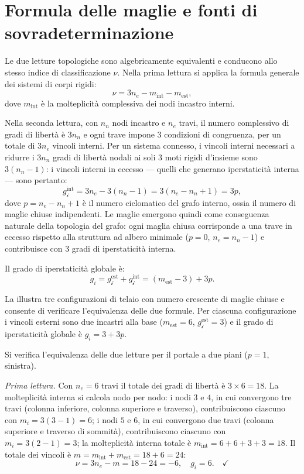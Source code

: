 \section{Formula delle maglie e fonti di sovradeterminazione}
\label{sec:telai_formula_maglie}


Le due letture topologiche sono algebricamente
equivalenti e conducono allo stesso indice di
classificazione $\nu$. Nella prima lettura si
applica la formula generale dei sistemi di corpi
rigidi:
\[
\nu = 3n_e - m_{\text{int}} - m_{\text{est}},
\]
dove $m_{\text{int}}$ è la molteplicità complessiva
dei nodi incastro interni.

Nella seconda lettura, con $n_n$ nodi incastro
e $n_e$ travi, il numero complessivo di gradi di
libertà è $3n_n$ e ogni trave impone $3$ condizioni
di congruenza, per un totale di $3n_e$ vincoli
interni. Per un sistema connesso, i vincoli interni
necessari a ridurre i $3n_n$ gradi di libertà nodali
ai soli $3$ moti rigidi d'insieme sono $3(n_n - 1)$:
i vincoli interni in eccesso --- quelli che generano
iperstaticità interna --- sono pertanto:
\[
g_{\mathscr{i}}^{\text{int}}
= 3n_e - 3(n_n - 1)
= 3(n_e - n_n + 1)
= 3p,
\]
dove $p = n_e - n_n + 1$ è il numero ciclomatico
del grafo interno, ossia il numero di maglie chiuse
indipendenti. Le maglie emergono quindi come
conseguenza naturale della topologia del grafo:
ogni maglia chiusa corrisponde a una trave in
eccesso rispetto alla struttura ad albero minimale
($p = 0$, $n_e = n_n - 1$) e contribuisce con
$3$ gradi di iperstaticità interna.

Il grado di iperstaticità globale è:
\begin{equation}\label{eq:class_telaio_globale}
	g_i = g_{\mathscr{i}}^{\text{est}} +
	g_{\mathscr{i}}^{\text{int}}
	= (m_{\text{est}} - 3) + 3p.
\end{equation}

La  illustra tre configurazioni
di telaio con numero crescente di maglie chiuse
e consente di verificare l'equivalenza delle due
formule. Per ciascuna configurazione i vincoli
esterni sono due incastri alla base
($m_{\text{est}} = 6$, $g_{\mathscr{i}}^{\text{est}} = 3$)
e il grado di iperstaticità globale è $g_i = 3 + 3p$.

Si verifica l'equivalenza delle due letture per
il portale a due piani ($p = 1$, sinistra).

\medskip
\noindent\textit{Prima lettura.}
Con $n_e = 6$ travi il totale dei gradi di libertà
è $3 \times 6 = 18$. La molteplicità interna si
calcola nodo per nodo: i nodi $3$ e $4$, in cui
convergono tre travi (colonna inferiore, colonna
superiore e traverso), contribuiscono ciascuno con
$m_i = 3(3-1) = 6$; i nodi $5$ e $6$, in cui
convergono due travi (colonna superiore e traverso
di sommità), contribuiscono ciascuno con
$m_i = 3(2-1) = 3$; la molteplicità interna totale
è $m_{\text{int}} = 6+6+3+3 = 18$. Il totale dei
vincoli è $m = m_{\text{int}} + m_{\text{est}}
= 18 + 6 = 24$:
\[
\nu = 3n_e - m = 18 - 24 = -6,
\quad g_i = 6. \quad\checkmark
\]


